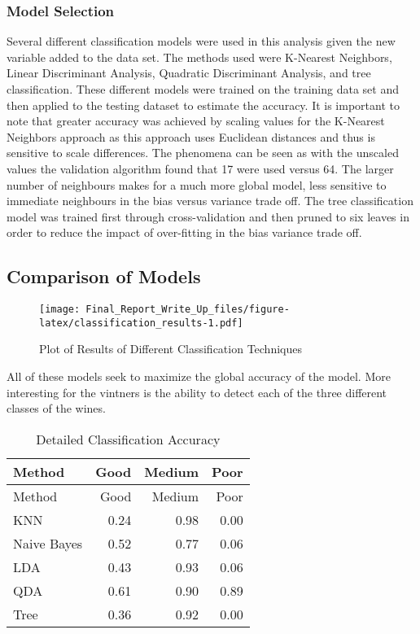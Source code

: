 \documentclass[]{article}
\begin{document}
\subsubsection{Model Selection}\label{model-selection-1}

Several different classification models were used in this analysis given
the new variable added to the data set. The methods used were K-Nearest
Neighbors, Linear Discriminant Analysis, Quadratic Discriminant
Analysis, and tree classification. These different models were trained
on the training data set and then applied to the testing dataset to
estimate the accuracy. It is important to note that greater accuracy was
achieved by scaling values for the K-Nearest Neighbors approach as this
approach uses Euclidean distances and thus is sensitive to scale
differences. The phenomena can be seen as with the unscaled values the
validation algorithm found that 17 were used versus 64. The larger
number of neighbours makes for a much more global model, less sensitive
to immediate neighbours in the bias versus variance trade off. The tree
classification model was trained first through cross-validation and then
pruned to six leaves in order to reduce the impact of over-fitting in
the bias variance trade off.

\subsection{Comparison of Models}\label{comparison-of-models}

\begin{figure}[H]
\centering
\texttt{[image: Final\_Report\_Write\_Up\_files/figure-latex/classification\_results-1.pdf]}
\caption{Plot of Results of Different Classification Techniques}
\end{figure}

All of these models seek to maximize the global accuracy of the model.
More interesting for the vintners is the ability to detect each of the
three different classes of the wines.

\begin{longtable}[]{@{}lrrr@{}}
\caption{Detailed Classification Accuracy}\tabularnewline
\toprule
Method & Good & Medium & Poor\tabularnewline
\midrule
\endfirsthead
\toprule
Method & Good & Medium & Poor\tabularnewline
\midrule
\endhead
KNN & 0.24 & 0.98 & 0.00\tabularnewline
Naive Bayes & 0.52 & 0.77 & 0.06\tabularnewline
LDA & 0.43 & 0.93 & 0.06\tabularnewline
QDA & 0.61 & 0.90 & 0.89\tabularnewline
Tree & 0.36 & 0.92 & 0.00\tabularnewline
\bottomrule
\end{longtable}
\end{document}
